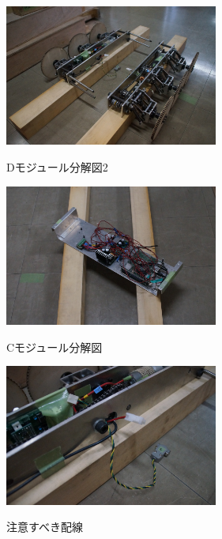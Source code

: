 \begin{figure}[htp]
 \begin{center}
  \includegraphics[width=70mm]{img/hard/f9.jpg}
 　\caption{Dモジュール分解図2}
  \label{fig:robot3}%
 \end{center}
\end{figure}


\begin{figure}[htp]
 \begin{center}
  \includegraphics[width=70mm]{img/hard/f8.jpg}
 　\caption{Cモジュール分解図}
  \label{fig:robot4}%
 \end{center}
\end{figure}


\begin{figure}[htp]
 \begin{center}
  \includegraphics[width=70mm]{img/hard/f7.jpg}
 　\caption{注意すべき配線}
  \label{fig:robot5}%
 \end{center}
\end{figure}




